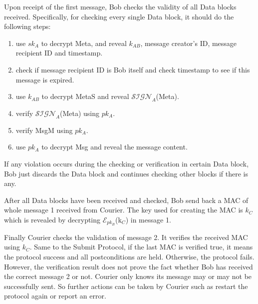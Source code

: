 Upon receipt of the first message, Bob checks the validity of all Data blocks received. Specifically, for checking every single Data block, it should do the following steps:
 \begin{enumerate}
 \item use $ sk_A $ to decrypt Meta, and reveal $ k_{AB} $, message creator's ID, message recipient ID and timestamp.
 \item check if message recipient ID is Bob itself and check timestamp to see if this message is expired.
 \item use $ k_{AB} $ to decrypt MetaS and reveal $\mathcal{SIGN}_A$(Meta).
 \item verify $\mathcal{SIGN}_A$(Meta) using $ pk_A $.
 \item verify MsgM using $ pk_A $.
 \item use $ pk_A $ to decrypt Msg and reveal the message content.
 \end{enumerate}
If any violation occurs during the checking or verification in certain Data block, Bob just discards the Data block and continues checking other blocks if there is any.

After all Data blocks have been received and checked, Bob send back a MAC of whole message 1 received from Courier. The key used for creating the MAC is $ k_C $ which is revealed by decrypting $\mathcal{E}_{pk_B}$(k$_C$) in message 1. 

Finally Courier checks the validation of message 2. It verifies the received MAC using $ k_C $. Same to the Submit Protocol, if the last MAC is verified true, it means the protocol success and all postconditions are held. Otherwise, the protocol fails. However, the verification result does not prove the fact whether Bob has received the correct message 2 or not. Courier only knows its message may or may not be successfully sent. So further actions can be taken by Courier such as restart the protocol again or report an error.
